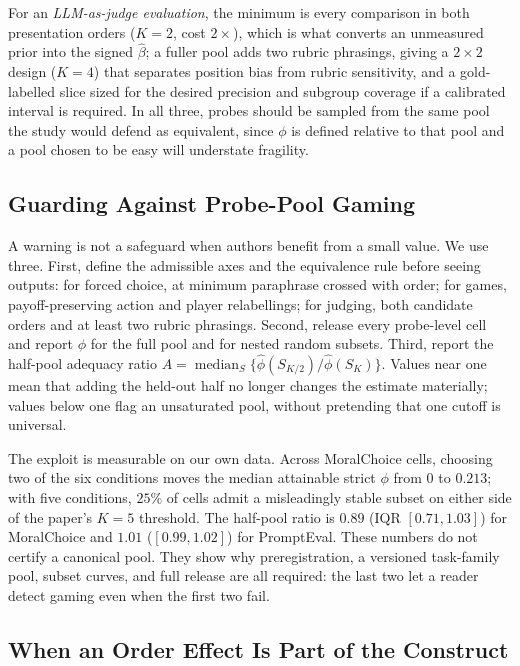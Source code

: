 \documentclass[11pt]{article}
\begin{document}
For an \emph{LLM-as-judge evaluation}, the minimum is every comparison in both
presentation orders ($K=2$, cost $2\times$), which is what converts an unmeasured
prior into the signed $\hat\beta$; a fuller pool adds two rubric phrasings, giving
a $2\times2$ design ($K=4$) that separates position bias from rubric sensitivity,
and a gold-labelled slice sized for the desired precision and subgroup coverage
if a calibrated interval is required. In all three, probes should be sampled from the same pool the study
would defend as equivalent, since $\phi$ is defined relative to that pool and a
pool chosen to be easy will understate fragility.

\subsection{Guarding Against Probe-Pool Gaming}
\label{app:poolgaming}

A warning is not a safeguard when authors benefit from a small value. We use
three. First, define the admissible axes and the equivalence rule before seeing
outputs: for forced choice, at minimum paraphrase crossed with order; for games,
payoff-preserving action and player relabellings; for judging, both candidate
orders and at least two rubric phrasings. Second, release every probe-level cell
and report $\phi$ for the full pool and for nested random subsets. Third, report
the half-pool adequacy ratio
$A=\operatorname{median}_S\{\hat\phi(S_{K/2})/\hat\phi(S_K)\}$. Values near one
mean that adding the held-out half no longer changes the estimate materially;
values below one flag an unsaturated pool, without pretending that one cutoff is
universal.

The exploit is measurable on our own data. Across MoralChoice cells, choosing
two of the six conditions moves the median attainable strict $\phi$ from $0$ to
$0.213$; with five conditions, $25\%$ of cells admit a misleadingly stable subset on
either side of the paper's $K=5$ threshold. The half-pool ratio is $0.89$ (IQR
$[0.71,1.03]$) for MoralChoice and $1.01$ ($[0.99,1.02]$) for PromptEval. These
numbers do not certify a canonical pool. They show why preregistration, a
versioned task-family pool, subset curves, and full release are all required:
the last two let a reader detect gaming even when the first two fail.

\subsection{When an Order Effect Is Part of the Construct}
\label{app:t2construct}
\end{document}
